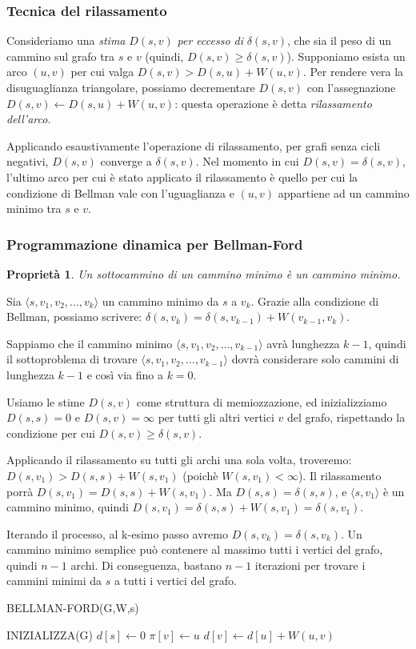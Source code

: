 \documentclass[11pt]{book}
\newtheorem*{proprietà}{Proprietà}
\begin{document}
\subsubsection{Tecnica del rilassamento}
Consideriamo una \textit{stima} $D(s,v)$ \textit{per eccesso di} $\delta(s,v)$, che sia il peso di un cammino sul grafo 
tra $s$ e $v$ (quindi, $D(s,v)\geq \delta(s,v)$).
Supponiamo esista un arco $(u,v)$ per cui valga $D(s,v)>D(s,u)+W(u,v)$. Per rendere vera la disuguaglianza triangolare, 
possiamo decrementare $D(s,v)$ con l'assegnazione $D(s,v)\gets D(s,u)+W(u,v)$: questa operazione è detta \textit{rilassamento 
dell'arco}.

Applicando esaustivamente l'operazione di rilassamento, per grafi senza cicli negativi, $D(s,v)$ converge a $\delta(s,v)$.
Nel momento in cui $D(s,v)=\delta(s,v)$, l'ultimo arco per cui è stato applicato il rilassamento è quello per cui la condizione
di Bellman vale con l'uguaglianza e $(u,v)$ appartiene ad un cammino minimo tra $s$ e $v$. 
\subsubsection{Programmazione dinamica per Bellman-Ford}
\begin{proprietà}
    Un sottocammino di un cammino minimo è un cammino minimo.
\end{proprietà}
Sia $\langle s,v_1,v_2,\dots,v_k \rangle$ un cammino minimo da $s$ a $v_k$. Grazie alla condizione di Bellman, possiamo 
scrivere: $\delta(s,v_k)=\delta(s,v_{k-1})+W(v_{k-1},v_k)$.

Sappiamo che il cammino minimo $\langle s,v_1,v_2,\dots,v_{k-1} \rangle$ avrà lunghezza $k-1$, quindi il sottoproblema di 
trovare $\langle s,v_1,v_2,\dots,v_{k-1} \rangle$ dovrà considerare solo cammini di lunghezza $k-1$ e così via fino a $k=0$.

Usiamo le stime $D(s,v)$ come struttura di memiozzazione, ed inizializziamo $D(s,s)=0$ e $D(s,v)=\infty$ per tutti gli 
altri vertici $v$ del grafo, rispettando la condizione per cui $D(s,v)\geq \delta(s,v)$.

Applicando il rilassamento su tutti gli archi una sola volta, troveremo: $D(s,v_1)>D(s,s)+W(s,v_1)$ (poichè $W(s,v_1)<\infty$).
Il rilassamento porrà $D(s,v_1)=D(s,s)+W(s,v_1)$. Ma $D(s,s)=\delta(s,s)$, e $\langle s,v_1 \rangle$ è un cammino minimo, 
quindi $D(s,v_1)=\delta(s,s)+W(s,v_1)=\delta(s,v_1)$.  

Iterando il processo, al k-esimo passo avremo $D(s,v_k)=\delta(s,v_k)$.
Un cammino minimo semplice può contenere al massimo tutti i vertici del grafo, quindi $n-1$ archi. Di conseguenza, bastano 
$n-1$ iterazioni per trovare i cammini minimi da $s$ a tutti i vertici del grafo.
\begin{algorithm}
    \caption{BELLMAN-FORD(G,W,s)}
    \begin{algorithmic}
        \State INIZIALIZZA(G)
        \State $d[s]\gets 0$
                    \State $\pi[v]\gets u$
                    \State $d[v]\gets d[u]+W(u,v)$
                \EndIf 
            \EndFor 
        \EndFor
    \end{algorithmic}
\end{algorithm}
\end{document}
